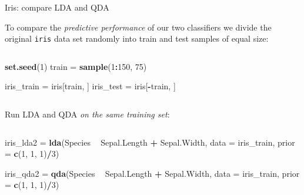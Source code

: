 \documentclass[10pt,ignorenonframetext,]{beamer}
\newenvironment{Shaded}{\begin{snugshade}}{\end{snugshade}}
\newcommand{\DataTypeTok}[1]{\textcolor[rgb]{0.13,0.29,0.53}{#1}}
\newcommand{\DecValTok}[1]{\textcolor[rgb]{0.00,0.00,0.81}{#1}}
\newcommand{\KeywordTok}[1]{\textcolor[rgb]{0.13,0.29,0.53}{\textbf{#1}}}
\newcommand{\NormalTok}[1]{#1}
\newcommand{\OperatorTok}[1]{\textcolor[rgb]{0.81,0.36,0.00}{\textbf{#1}}}
\newcommand{\StringTok}[1]{\textcolor[rgb]{0.31,0.60,0.02}{#1}}
\begin{document}
\begin{frame}[fragile]

\begin{block}{Iris: compare LDA and QDA}

\vspace{2mm}

To compare the \emph{predictive performance} of our two classifiers we
divide the original \texttt{iris} data set randomly into train and test
samples of equal size:

\(~\)

\scriptsize

\begin{Shaded}
\begin{Highlighting}[]
\KeywordTok{set.seed}\NormalTok{(}\DecValTok{1}\NormalTok{)}
\NormalTok{train =}\StringTok{ }\KeywordTok{sample}\NormalTok{(}\DecValTok{1}\OperatorTok{:}\DecValTok{150}\NormalTok{, }\DecValTok{75}\NormalTok{)}

\NormalTok{iris_train =}\StringTok{ }\NormalTok{iris[train, ]}
\NormalTok{iris_test =}\StringTok{ }\NormalTok{iris[}\OperatorTok{-}\NormalTok{train, ]}
\end{Highlighting}
\end{Shaded}

\normalsize

\(~\)

Run LDA and QDA \emph{on the same training set}:

\(~\)

\scriptsize

\begin{Shaded}
\begin{Highlighting}[]
\NormalTok{iris_lda2 =}\StringTok{ }\KeywordTok{lda}\NormalTok{(Species }\OperatorTok{~}\StringTok{ }\NormalTok{Sepal.Length }\OperatorTok{+}\StringTok{ }\NormalTok{Sepal.Width, }\DataTypeTok{data =}\NormalTok{ iris_train, }
    \DataTypeTok{prior =} \KeywordTok{c}\NormalTok{(}\DecValTok{1}\NormalTok{, }\DecValTok{1}\NormalTok{, }\DecValTok{1}\NormalTok{)}\OperatorTok{/}\DecValTok{3}\NormalTok{)}

\NormalTok{iris_qda2 =}\StringTok{ }\KeywordTok{qda}\NormalTok{(Species }\OperatorTok{~}\StringTok{ }\NormalTok{Sepal.Length }\OperatorTok{+}\StringTok{ }\NormalTok{Sepal.Width, }\DataTypeTok{data =}\NormalTok{ iris_train, }
    \DataTypeTok{prior =} \KeywordTok{c}\NormalTok{(}\DecValTok{1}\NormalTok{, }\DecValTok{1}\NormalTok{, }\DecValTok{1}\NormalTok{)}\OperatorTok{/}\DecValTok{3}\NormalTok{)}
\end{Highlighting}
\end{Shaded}

\end{block}

\end{frame}
\end{document}
